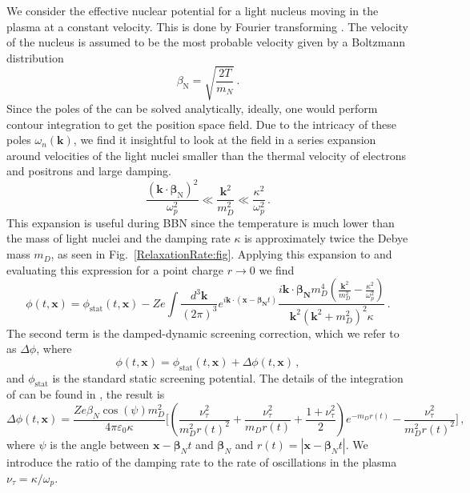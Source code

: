 We consider the effective nuclear potential for a light nucleus moving in the plasma at a constant velocity. This is done by Fourier transforming . The velocity of the nucleus is assumed to be the most probable velocity given by a Boltzmann distribution
\begin{equation}\label{eq:vel}
 \beta_{\text{N}} = \sqrt{\frac{2T}{m_N}}\,. 
\end{equation}
Since the poles of the  can be solved analytically, ideally, one would perform contour integration to get the position space field. Due to the intricacy of these poles $\omega_n(\boldsymbol{k})$, we find it insightful to look at the field in a series expansion around velocities of the light nuclei smaller than the thermal velocity of electrons and positrons and large damping.
\begin{equation}\label{eq:expansion}
\frac{(\boldsymbol{k}\cdot\boldsymbol{\beta}_{\text{N}})^2}{\omega_p^2} \ll \frac{\boldsymbol{k}^2}{m_D^2} \ll \frac{\kappa^2}{\omega_p^2}\, .
\end{equation}
This expansion is useful during BBN since the temperature is much lower than the mass of light nuclei and the damping rate $\kappa$ is approximately twice the Debye mass $m_D$, as seen in Fig.~\ref{RelaxationRate:fig}. Applying this expansion to  and evaluating this expression for a point charge $r \rightarrow 0$ we find
\begin{equation}\label{eq:ddsint}
\phi(t,\boldsymbol{x}) =\phi_{\text{stat}}(t,\boldsymbol{x})-Ze\int \frac{d^3\boldsymbol{k}}{(2\pi)^3} e^{ i\boldsymbol{k}\cdot(\boldsymbol{x}-\boldsymbol{\beta_{\text{N}}} t)}\frac{i \boldsymbol{k}\cdot \boldsymbol{\beta_{\text{N}}} m_D^4 (\frac{\boldsymbol{k}^2}{m_D^2} - \frac{\kappa^2}{\omega_p^2})}{\boldsymbol{k}^2(\boldsymbol{k}^2+m_D^2)^2\kappa}\,.
\end{equation}
The second term is the damped-dynamic screening correction, which we refer to as $\Delta \phi$, where
\begin{equation}\label{eq:pos_point}
\phi(t,\boldsymbol{x}) = \phi_{\text{stat}}(t,\boldsymbol{x}) +\Delta \phi(t,\boldsymbol{x}) \,,
\end{equation}
and $\phi_{\text{stat}}$ is the standard static screening potential. The details of the integration of  can be found in \cite{Grayson:2023flr}, the result is
\begin{equation}\label{eq:pos_point_DDS}
\Delta \phi(t,\boldsymbol{x}) = \frac{Ze \beta_N \cos (\psi) m_D^2}{4 \pi \varepsilon_0 \kappa} \Bigg[\left(\frac{\nu_\tau^2}{m_D^2 r(t)^2} + \frac{\nu_\tau^2}{m_D r(t)}+\frac{1 + \nu_\tau^2}{2}\right)e^{-m_D r(t)}   -\frac{\nu_\tau^2}{m_D^2 r(t)^2}\Bigg]\,,
\end{equation}
where $\psi$ is the angle between $\boldsymbol{x}-\boldsymbol{\beta}_N t$ and $\boldsymbol{\beta}_N$ and $r(t) = |\boldsymbol{x}-\boldsymbol{\beta}_N t|$.
We introduce the ratio of the damping rate to the rate of oscillations in the plasma $\nu_\tau = \kappa/\omega_p$.  

